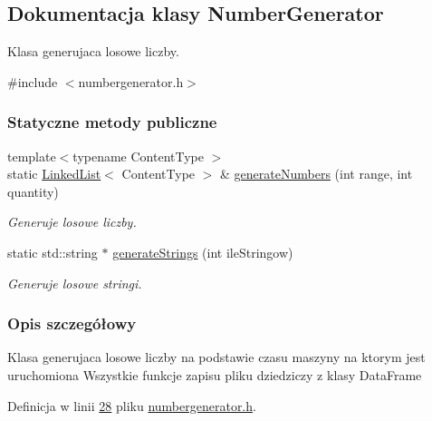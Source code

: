 \hypertarget{class_number_generator}{\subsection{Dokumentacja klasy Number\-Generator}
\label{class_number_generator}
}


Klasa generujaca losowe liczby.  




{\ttfamily \#include $<$numbergenerator.\-h$>$}

\subsubsection*{Statyczne metody publiczne}
\begin{DoxyCompactItemize}
\item 
{\footnotesize template$<$typename Content\-Type $>$ }\\static \hyperlink{class_linked_list}{Linked\-List}$<$ Content\-Type $>$ \& \hyperlink{class_number_generator_a4a31ee39c34c77b01f19516fd5253389}{generate\-Numbers} (int range, int quantity)
\begin{DoxyCompactList}\small\item\em Generuje losowe liczby. \end{DoxyCompactList}\item 
static std\-::string $\ast$ \hyperlink{class_number_generator_afed5ae8efb72655770753790714b7643}{generate\-Strings} (int ile\-Stringow)
\begin{DoxyCompactList}\small\item\em Generuje losowe stringi. \end{DoxyCompactList}\end{DoxyCompactItemize}


\subsubsection{Opis szczegółowy}
Klasa generujaca losowe liczby na podstawie czasu maszyny na ktorym jest uruchomiona Wszystkie funkcje zapisu pliku dziedziczy z klasy Data\-Frame 

Definicja w linii \hyperlink{numbergenerator_8h_source_l00028}{28} pliku \hyperlink{numbergenerator_8h_source}{numbergenerator.\-h}.



